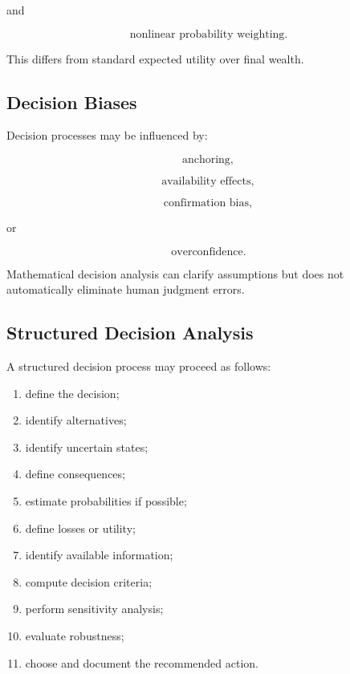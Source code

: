 and

\[
\boxed{
\text{nonlinear probability weighting}.
}
\]

This differs from standard expected utility over final wealth.

\subsection{Decision Biases}
\label{subsec:decision-biases}

Decision processes may be influenced by:

\[
\boxed{
\text{anchoring},
}
\]

\[
\boxed{
\text{availability effects},
}
\]

\[
\boxed{
\text{confirmation bias},
}
\]

or

\[
\boxed{
\text{overconfidence}.
}
\]

Mathematical decision analysis can clarify assumptions but does not
automatically eliminate human judgment errors.

\subsection{Structured Decision Analysis}
\label{subsec:structured-decision-analysis}

A structured decision process may proceed as follows:

\begin{enumerate}
    \item define the decision;
    \item identify alternatives;
    \item identify uncertain states;
    \item define consequences;
    \item estimate probabilities if possible;
    \item define losses or utility;
    \item identify available information;
    \item compute decision criteria;
    \item perform sensitivity analysis;
    \item evaluate robustness;
    \item choose and document the recommended action.
\end{enumerate}

